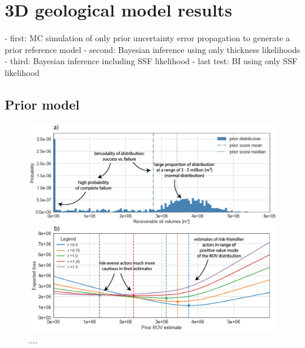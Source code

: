				
		\section{3D geological model results}
		- first: MC simulation of only prior uncertainty error propagation to generate a prior reference model
		- second: Bayesian inference using only thickness likelihoods
		- third: Bayesian inference including SSF likelihood
		- last test: BI using only SSF likelihood
		
		\subsection{Prior model}
		\begin{figure}[h]
			\centering
			\includegraphics[width=1\textwidth]{Figures/M_prior}
			\caption{....}\label{fig:M_prior}
		\end{figure}
		

